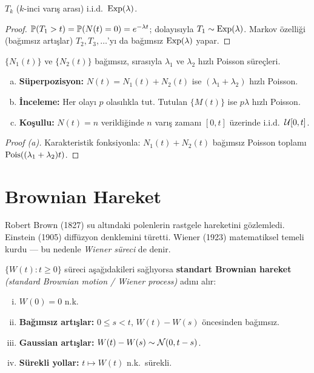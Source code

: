 \begin{teorem}\label{thm:varis_aralari}
$T_k$ ($k$-inci varış arası) i.i.d.\ $\operatorname{Exp}(\lambda)$.
\end{teorem}

\begin{proof}
$\mathbb{P}(T_1>t) = \mathbb{P}(N(t)=0)=e^{-\lambda t}$; dolayısıyla $T_1\sim\operatorname{Exp}(\lambda)$. Markov özelliği (bağımsız artışlar) $T_2,T_3,\ldots$'yı da bağımsız $\operatorname{Exp}(\lambda)$ yapar.
\end{proof}

\begin{teorem}\label{thm:poisson_ozellikler}
$\{N_1(t)\}$ ve $\{N_2(t)\}$ bağımsız, sırasıyla $\lambda_1$ ve $\lambda_2$ hızlı Poisson süreçleri.
\begin{enumerate}[(a)]
  \item \textbf{Süperpozisyon:} $N(t)=N_1(t)+N_2(t)$ ise $(\lambda_1+\lambda_2)$ hızlı Poisson.
  \item \textbf{İnceleme:} Her olayı $p$ olasılıkla tut. Tutulan $\{M(t)\}$ ise $p\lambda$ hızlı Poisson.
  \item \textbf{Koşullu:} $N(t)=n$ verildiğinde $n$ varış zamanı $[0,t]$ üzerinde i.i.d.\ $\mathcal{U}[0,t]$.
\end{enumerate}
\end{teorem}

\begin{proof}[Proof (a)]
Karakteristik fonksiyonla: $N_1(t)+N_2(t)$ bağımsız Poisson toplamı $\operatorname{Pois}((\lambda_1+\lambda_2)t)$.
\end{proof}

\section{Brownian Hareket}
\label{sec:brownian}

\begin{tarihselnot}
Robert Brown (1827) su altındaki polenlerin rastgele hareketini gözlemledi. Einstein (1905) diffüzyon denklemini türetti. Wiener (1923) matematiksel temeli kurdu --- bu nedenle \emph{Wiener süreci} de denir.
\end{tarihselnot}

\begin{tanim}\label{def:brownian}
$\{W(t): t\geq0\}$ süreci aşağıdakileri sağlıyorsa \textbf{standart Brownian hareket} \emph{(standard Brownian motion / Wiener process)} adını alır:
\begin{enumerate}[(i)]
  \item $W(0)=0$ n.k.
  \item \textbf{Bağımsız artışlar:} $0\leq s<t$, $W(t)-W(s)$ öncesinden bağımsız.
  \item \textbf{Gaussian artışlar:} $W(t)-W(s)\sim\mathcal{N}(0,t-s)$.
  \item \textbf{Sürekli yollar:} $t\mapsto W(t)$ n.k.\ sürekli.
\end{enumerate}
\end{tanim}

